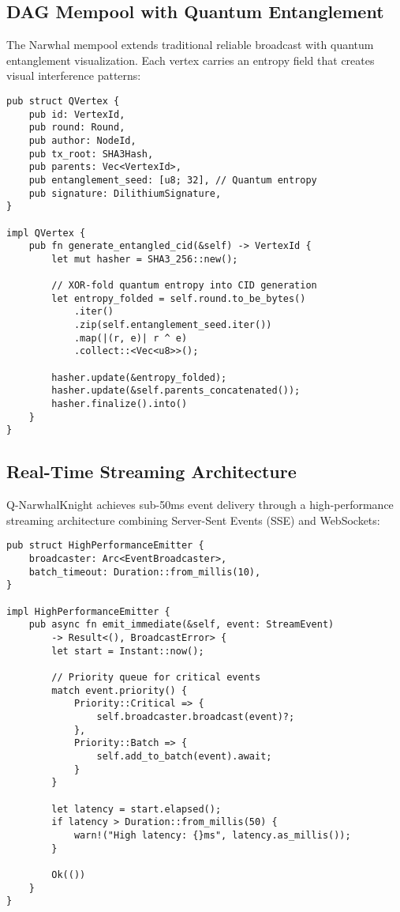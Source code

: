 \documentclass[12pt,a4paper]{article}
\begin{document}
\subsection{DAG Mempool with Quantum Entanglement}

The Narwhal mempool extends traditional reliable broadcast with quantum entanglement visualization. Each vertex carries an entropy field that creates visual interference patterns:

\begin{lstlisting}[caption=Quantum-Entangled Vertex Generation]
pub struct QVertex {
    pub id: VertexId,
    pub round: Round,
    pub author: NodeId,
    pub tx_root: SHA3Hash,
    pub parents: Vec<VertexId>,
    pub entanglement_seed: [u8; 32], // Quantum entropy
    pub signature: DilithiumSignature,
}

impl QVertex {
    pub fn generate_entangled_cid(&self) -> VertexId {
        let mut hasher = SHA3_256::new();
        
        // XOR-fold quantum entropy into CID generation
        let entropy_folded = self.round.to_be_bytes()
            .iter()
            .zip(self.entanglement_seed.iter())
            .map(|(r, e)| r ^ e)
            .collect::<Vec<u8>>();
            
        hasher.update(&entropy_folded);
        hasher.update(&self.parents_concatenated());
        hasher.finalize().into()
    }
}
\end{lstlisting}

\subsection{Real-Time Streaming Architecture}

Q-NarwhalKnight achieves sub-50ms event delivery through a high-performance streaming architecture combining Server-Sent Events (SSE) and WebSockets:

\begin{lstlisting}[caption=Ultra-Low Latency Event Streaming]
pub struct HighPerformanceEmitter {
    broadcaster: Arc<EventBroadcaster>,
    batch_timeout: Duration::from_millis(10),
}

impl HighPerformanceEmitter {
    pub async fn emit_immediate(&self, event: StreamEvent) 
        -> Result<(), BroadcastError> {
        let start = Instant::now();
        
        // Priority queue for critical events
        match event.priority() {
            Priority::Critical => {
                self.broadcaster.broadcast(event)?;
            },
            Priority::Batch => {
                self.add_to_batch(event).await;
            }
        }
        
        let latency = start.elapsed();
        if latency > Duration::from_millis(50) {
            warn!("High latency: {}ms", latency.as_millis());
        }
        
        Ok(())
    }
}
\end{lstlisting}
\end{document}
